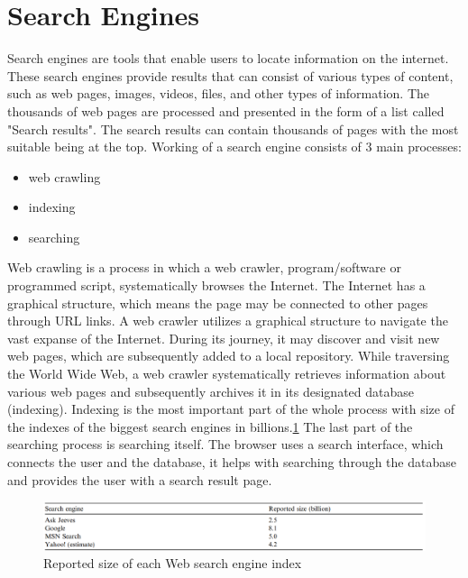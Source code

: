 \documentclass[10pt,a4paper]{article}
\begin{document}
\section{Search Engines}
Search engines\cite{SEReleC} are tools that enable users to locate information on the internet. These search engines provide results that can consist of various types of content, such as web pages, images, videos, files, and other types of information. The thousands of web pages are processed and presented in the form of a list called "Search results". The search results can contain thousands of pages with the most suitable being at the top. Working of a search engine consists of 3 main processes:
\begin{itemize}
\item web crawling
\item indexing
\item searching
\end{itemize}

Web crawling \cite{WebCrawler} is a process in which a web crawler, program/software or programmed script, systematically browses the Internet. The Internet has a graphical structure, which means the page may be connected to other pages through URL links. A web crawler utilizes a graphical structure to navigate the vast expanse of the Internet. During its journey, it may discover and visit new web pages, which are subsequently added to a local repository. While traversing the World Wide Web, a web crawler systematically retrieves information about various web pages and subsequently archives it in its designated database (indexing). Indexing is the most important part of the whole process with size of the indexes of the biggest search engines in billions.\ref{Table 1} The last part of the searching process is searching itself. The browser uses a search interface, which connects the user and the database, it helps with searching through the database and provides the user with a search result page. 

\begin{figure}[h]
\center
\includegraphics[scale=0.5]{table1.png}
\caption{Reported size of each Web search engine index\cite{SPINK20061379}}
\label{Table 1}
\end{figure}
\end{document}
